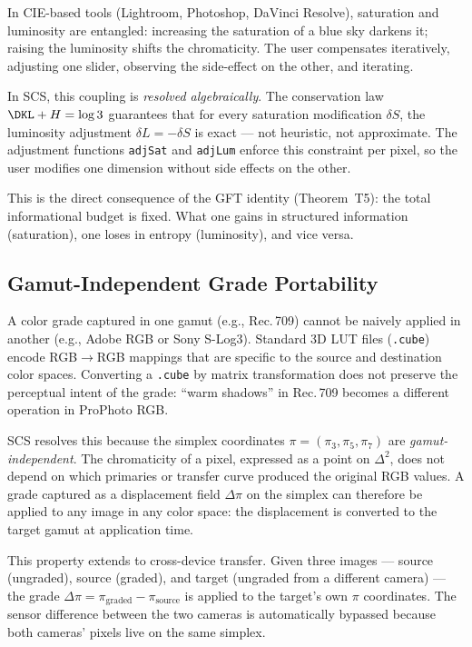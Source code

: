 \documentclass[12pt,a4paper]{article}
\begin{document}
In CIE-based tools (Lightroom, Photoshop, DaVinci Resolve), saturation
and luminosity are entangled: increasing the saturation of a blue sky
darkens it; raising the luminosity shifts the chromaticity. The user
compensates iteratively, adjusting one slider, observing the side-effect
on the other, and iterating.

In SCS, this coupling is \emph{resolved algebraically}. The
conservation law $\DKL + H = \log 3$ guarantees that for every
saturation modification $\delta S$, the luminosity adjustment
$\delta L = -\delta S$ is exact --- not heuristic, not approximate.
The adjustment functions \texttt{adjSat} and \texttt{adjLum} enforce
this constraint per pixel, so the user modifies one dimension without
side effects on the other.

This is the direct consequence of the GFT identity (Theorem~T5):
the total informational budget is fixed. What one gains in structured
information (saturation), one loses in entropy (luminosity), and
vice versa.

\subsection{Gamut-Independent Grade Portability}

A color grade captured in one gamut (e.g., Rec.\,709) cannot be
naively applied in another (e.g., Adobe RGB or Sony S-Log3). Standard
3D LUT files (\texttt{.cube}) encode RGB$\to$RGB mappings that are
specific to the source and destination color spaces. Converting a
\texttt{.cube} by matrix transformation does not preserve the
perceptual intent of the grade: ``warm shadows'' in Rec.\,709 becomes
a different operation in ProPhoto RGB.

SCS resolves this because the simplex coordinates
$\pi = (\pi_3, \pi_5, \pi_7)$ are \emph{gamut-independent}. The
chromaticity of a pixel, expressed as a point on $\Delta^2$, does not
depend on which primaries or transfer curve produced the original RGB
values. A grade captured as a displacement field $\Delta\pi$ on the
simplex can therefore be applied to any image in any color space: the
displacement is converted to the target gamut at application time.

This property extends to cross-device transfer. Given three images ---
source (ungraded), source (graded), and target (ungraded from a
different camera) --- the grade $\Delta\pi = \pi_\mathrm{graded} -
\pi_\mathrm{source}$ is applied to the target's own $\pi$ coordinates.
The sensor difference between the two cameras is automatically bypassed
because both cameras' pixels live on the same simplex.
\end{document}
